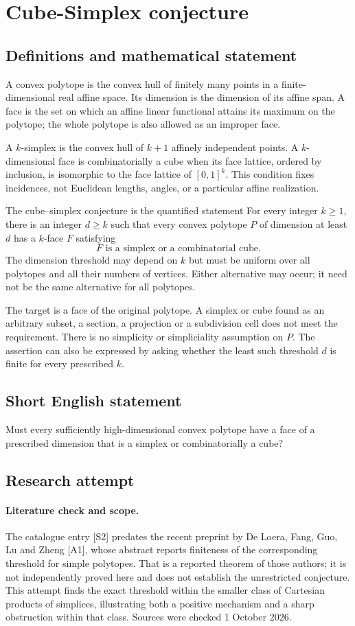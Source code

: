 \documentclass[11pt,a4paper]{article}
\begin{document}
\section*{Cube-Simplex conjecture}\label{statement}

\subsection{Definitions and mathematical statement}
A convex polytope is the convex hull of finitely many points in a
finite-dimensional real affine space. Its dimension is the dimension of
its affine span. A face is the set on which an affine linear functional
attains its maximum on the polytope; the whole polytope is also allowed
as an improper face.

A $k$-simplex is the convex hull of $k+1$ affinely independent points.
A $k$-dimensional face is combinatorially a cube when its face lattice,
ordered by inclusion, is isomorphic to the face lattice of $[0,1]^k$.
This condition fixes incidences, not Euclidean lengths, angles, or a
particular affine realization.

The cube--simplex conjecture is the quantified statement
For every integer $k\ge1$, there is an integer $d\ge k$ such that
 every convex polytope $P$ of dimension at least $d$ has a $k$-face $F$
 satisfying
\[
       F\text{ is a simplex or a combinatorial cube}.
\]
The dimension threshold may depend on $k$ but must be uniform over all
polytopes and all their numbers of vertices. Either alternative may occur;
it need not be the same alternative for all polytopes.

The target is a face of the original polytope. A simplex or cube found
as an arbitrary subset, a section, a projection or a subdivision cell
does not meet the requirement. There is no simplicity or simpliciality
assumption on $P$. The assertion can also be expressed by asking whether
the least such threshold $d$ is finite for every prescribed $k$.
\subsection{Short English statement}
Must every sufficiently high-dimensional convex polytope have a face of a prescribed dimension that is a simplex or combinatorially a cube?
\subsection{Research attempt}
\paragraph{Literature check and scope.}
The catalogue entry [S2] predates the recent preprint by De Loera, Fang, Guo,
Lu and Zheng [A1], whose abstract reports finiteness of the corresponding
threshold for simple polytopes. That is a reported theorem of those authors;
it is not independently proved here and does not establish the unrestricted
conjecture. This attempt finds the exact threshold within the smaller class
of Cartesian products of simplices, illustrating both a positive mechanism
and a sharp obstruction within that class. Sources were checked 1 October 2026.
\end{document}

